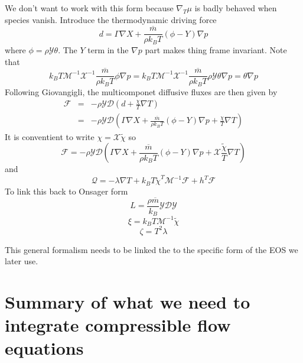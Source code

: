 \documentclass[11pt]{article}
\newcommand{\HeatFlux}{\boldsymbol{\mathcal{Q}}}
\newcommand{\SpeciesFlux}{\boldsymbol{\mathcal{F}}}
\newcommand{\mbar}{\overline{m}}
\begin{document}
We don't want to work with this form because $\nabla_T \mu$ is badly behaved when species vanish.
Introduce the thermodynamic driving force
\[
d = \Gamma \nabla X  + \frac{\mbar}{\rho k_B T} (\phi - Y) \nabla p
\]
where $\phi = \rho \mathcal{Y} \theta$.  The $Y$ term in the $\nabla p$ part makes thing frame invariant.
Note that
\[
k_B T \mathcal{M}^{-1} \mathcal{X}^{-1} \frac{\mbar}{\rho k_B T} \phi \nabla p = 
k_B T \mathcal{M}^{-1} \mathcal{X}^{-1} \frac{\mbar}{\rho k_B T} \rho \mathcal{Y} \theta \nabla p 
= \theta \nabla p
\]
Following Giovangigli,
the multicomponet diffusive fluxes are then given by
\begin{eqnarray}
\SpeciesFlux &=& -\rho \mathcal{Y} \mathcal{D} ( d + \frac{\chi}{T} \nabla T) \\
&=& -\rho \mathcal{Y} \mathcal{D} ( \Gamma \nabla X  + \frac{\mbar}{\rho k_B T} (\phi - Y) \nabla p
 + \frac{\chi}{T} \nabla T)
\end{eqnarray}
It is conventient to write $\chi = \mathcal{X}\tilde{\chi}$ so
\[
\SpeciesFlux = -\rho \mathcal{Y} \mathcal{D} ( \Gamma \nabla X  + \frac{\mbar}{\rho k_B T} (\phi - Y) \nabla p
 + \mathcal{X}\frac{\tilde{\chi}}{T} \nabla T)
\]
and
\[
\HeatFlux = - \lambda \nabla T + k_B T {\tilde{\chi}}^T \mathcal{M}^{-1} \SpeciesFlux + h^T \SpeciesFlux
\]
To link this back to Onsager form
\[
L = \frac{\rho \mbar}{k_B} \mathcal{Y} \mathcal{D} \mathcal{Y}
\]
\[
\xi = k_B T \mathcal{M}^{-1} \tilde{\chi}
\]
\[
\zeta = T^2 \lambda
\]

This general formalism needs to be linked the to the specific form of the EOS we later use.

\section{Summary of what we need to integrate compressible flow equations}
\end{document}
